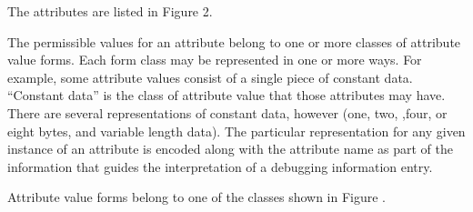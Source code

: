 The attributes are listed in Figure 2.  

The permissible values
for an attribute belong to one or more classes of attribute
value forms.  
Each form class may be represented in one or more ways. 
For example, some attribute values consist
of a single piece of constant data. 
``Constant data''
is the class of attribute value that those attributes may have. 
There are several representations of constant data,
however (one, two, ,four, or eight bytes, and variable length
data). 
The particular representation for any given instance
of an attribute is encoded along with the attribute name as
part of the information that guides the interpretation of a
debugging information entry.  

Attribute value forms belong
to one of the classes shown in Figure .

